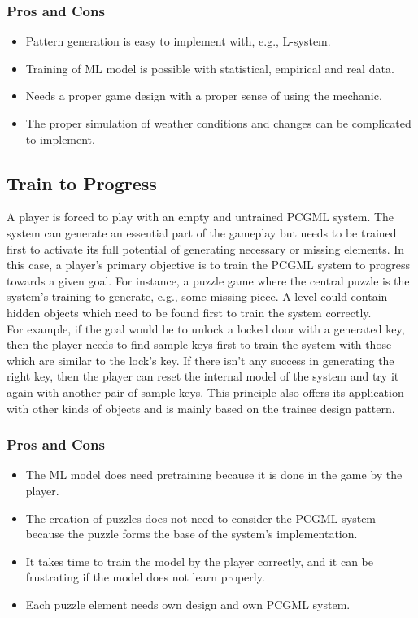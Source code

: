 \documentclass[MGS,Master,english]{twbook}%
\begin{document}
\subsubsection{Pros and Cons}
\begin{itemize}
	\item Pattern generation is easy to implement with, e.g., L-system.
	\item Training of ML model is possible with statistical, empirical and real data.
	\item Needs a proper game design with a proper sense of using the mechanic.
	\item The proper simulation of weather conditions and changes can be complicated to implement.
\end{itemize}


\subsection{Train to Progress} \label{idea::trainToProgress}
A player is forced to play with an empty and untrained PCGML system. The system can generate an essential part of the gameplay but needs to be trained first to activate its full potential of generating necessary or missing elements. In this case, a player’s primary objective is to train the PCGML system to progress towards a given goal. For instance, a puzzle game where the central puzzle is the system’s training to generate, e.g., some missing piece. A level could contain hidden objects which need to be found first to train the system correctly. \\
For example, if the goal would be to unlock a locked door with a generated key, then the player needs to find sample keys first to train the system with those which are similar to the lock's key. If there isn’t any success in generating the right key, then the player can reset the internal model of the system and try it again with another pair of sample keys. This principle also offers its application with other kinds of objects and is mainly based on the trainee design pattern.

\subsubsection{Pros and Cons}
\begin{itemize}
	\item The ML model does need pretraining because it is done in the game by the player.
	\item The creation of puzzles does not need to consider the PCGML system because the puzzle forms the base of the system's implementation.
	\item It takes time to train the model by the player correctly, and it can be frustrating if the model does not learn properly.
	\item Each puzzle element needs own design and own PCGML system.
\end{itemize}
\end{document}
